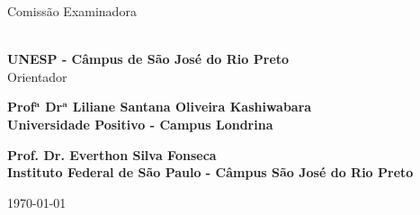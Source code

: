 	\begin{folhadeaprovacao}
	
	\begin{center}
		{\ABNTEXchapterfont\Large\imprimirautor}
		
		\vspace*{\fill}\vspace*{\fill}
		\begin{center}
			\ABNTEXchapterfont\LARGE\imprimirtitulo
		\end{center}
		\vspace*{\fill}
		
		\hspace{.45\textwidth}
			\begin{minipage}{.5\textwidth}
				\SingleSpacing
				\ABNTEXchapterfont\large\imprimirpreambulo
			\end{minipage}%
		\vspace*{\fill}
	\end{center}

	\begin{center}
		\ABNTEXchapterfont\Large Comissão Examinadora
	\end{center}

	\ABNTEXchapterfont\large
	
	\par \noindent \textbf{\imprimirorientador \\ UNESP - Câmpus de São José do Rio Preto} \\ Orientador \\
	
	\par \noindent \textbf{Prof$\mathbf{^a}$ Dr$\mathbf{^a}$ Liliane Santana Oliveira Kashiwabara \\ Universidade Positivo - Campus Londrina} \\
	
	\par \noindent \textbf{Prof. Dr. Everthon Silva Fonseca \\ Instituto Federal de São Paulo - Câmpus São José do Rio Preto} 
	
	
	\ABNTEXchapterfont
	
	\begin{center}
		\vspace*{0.5cm}
		{\large\imprimirlocal}
		\par
		{\large\today}
		\vspace*{1cm}
	\end{center}
\end{folhadeaprovacao}